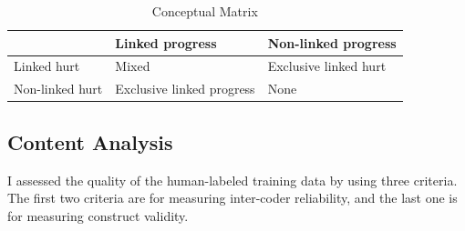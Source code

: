 \documentclass[12 pt]{article}
\begin{document}
\begin{table}[htbp!]
	\centering
	\caption{Conceptual Matrix}
	\label{tab:concet_map}
	\begin{tabularx}{\textwidth}{ X | X | X}
		\toprule
		& Linked progress & Non-linked progress \\ \midrule
		Linked hurt & Mixed & Exclusive linked hurt \\ \hline
		Non-linked hurt & Exclusive linked progress & None \\ \hline
		\bottomrule
	\end{tabularx}
\end{table}

\subsection{Content Analysis}
I assessed the quality of the human-labeled training data by using three criteria. The first two criteria are for measuring inter-coder reliability, and the last one is for measuring construct validity.
\end{document}
